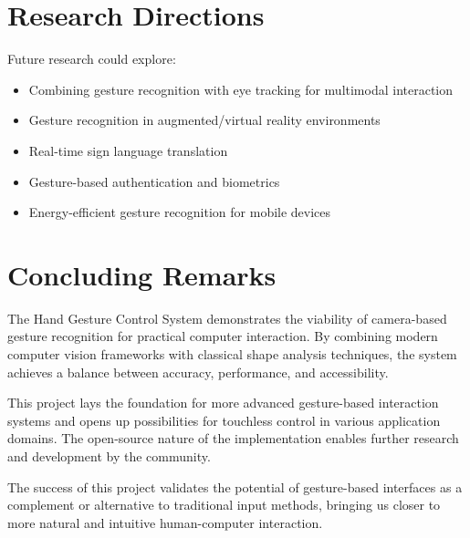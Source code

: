 \documentclass[12pt,a4paper]{report}
\begin{document}
\section{Research Directions}

Future research could explore:

\begin{itemize}
    \item Combining gesture recognition with eye tracking for multimodal interaction
    \item Gesture recognition in augmented/virtual reality environments
    \item Real-time sign language translation
    \item Gesture-based authentication and biometrics
    \item Energy-efficient gesture recognition for mobile devices
\end{itemize}

\section{Concluding Remarks}

The Hand Gesture Control System demonstrates the viability of camera-based gesture recognition for practical computer interaction. By combining modern computer vision frameworks with classical shape analysis techniques, the system achieves a balance between accuracy, performance, and accessibility.

This project lays the foundation for more advanced gesture-based interaction systems and opens up possibilities for touchless control in various application domains. The open-source nature of the implementation enables further research and development by the community.

The success of this project validates the potential of gesture-based interfaces as a complement or alternative to traditional input methods, bringing us closer to more natural and intuitive human-computer interaction.
\end{document}
